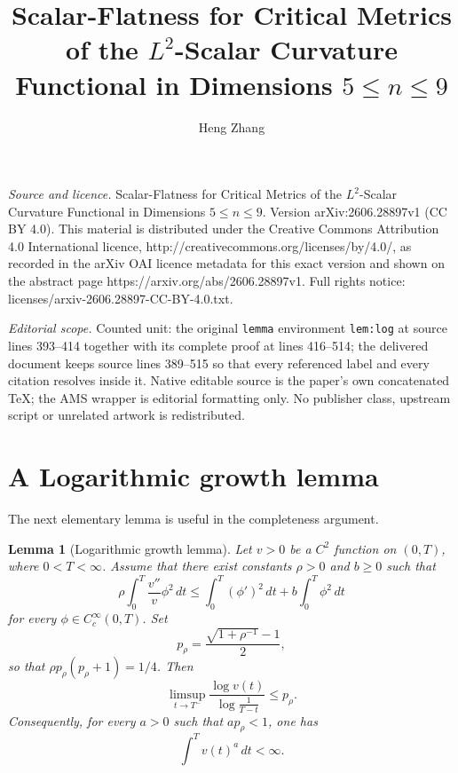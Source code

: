 \documentclass[10pt,a4paper]{amsart}
\numberwithin{equation}{section}
\newtheorem{lemma}[theorem]{Lemma}
\begin{document}
\title[Scalar-Flatness for Critical Metrics of the L^2-Scalar Curva]{Scalar-Flatness for Critical Metrics of the $L^2$-Scalar Curvature Functional in Dimensions $5\le n\le 9$}
\author{Heng Zhang}
\date{}
\maketitle
\noindent\emph{Source and licence.} Scalar-Flatness for Critical Metrics of the $L^2$-Scalar Curvature Functional in Dimensions $5\le n\le 9$. Version arXiv:2606.28897v1 (CC BY 4.0). This material is distributed under the Creative Commons Attribution 4.0 International licence, http://creativecommons.org/licenses/by/4.0/, as recorded in the arXiv OAI licence metadata for this exact version and shown on the abstract page https://arxiv.org/abs/2606.28897v1. Full rights notice: licenses/arxiv-2606.28897-CC-BY-4.0.txt.\par\smallskip
\noindent\textit{Editorial scope.} Counted unit: the original \texttt{lemma} environment \texttt{lem:log} at source lines 393--414 together with its complete proof at lines 416--514; the delivered document keeps source lines 389--515 so that every referenced label and every citation resolves inside it. Native editable source is the paper's own concatenated TeX; the AMS wrapper is editorial formatting only. No publisher class, upstream script or unrelated artwork is redistributed.
\section{A Logarithmic growth lemma}\label{sec:log}

The next elementary lemma is useful in the completeness argument.


\begin{lemma}[Logarithmic growth lemma]\label{lem:log}
Let $v>0$ be a $C^2$ function on $(0,T)$, where $0<T<\infty$.  Assume that there exist constants $\rho>0$ and $b\geq 0$ such that
\begin{equation}\label{log-assumption}
        \rho\int_0^T \frac{v''}{v}\phi^2\,dt
        \leq
        \int_0^T (\phi')^2\,dt+b\int_0^T \phi^2\,dt
\end{equation}
for every $\phi\in C_c^\infty(0,T)$.  Set
\begin{equation}\label{prho}
        p_\rho=\frac{\sqrt{1+\rho^{-1}}-1}{2},
\end{equation}
so that $\rho p_\rho(p_\rho+1)=1/4$.  Then
\begin{equation}\label{growth-conclusion}
        \limsup_{t\to T^-}
        \frac{\log v(t)}{\log \frac1{T-t}}
        \leq p_\rho .
\end{equation}
Consequently, for every $a>0$ such that $a p_\rho<1$, one has
\begin{equation}\label{integrability-conclusion}
        \int^{T} v(t)^a\,dt<\infty .
\end{equation}
\end{lemma}
\end{document}
